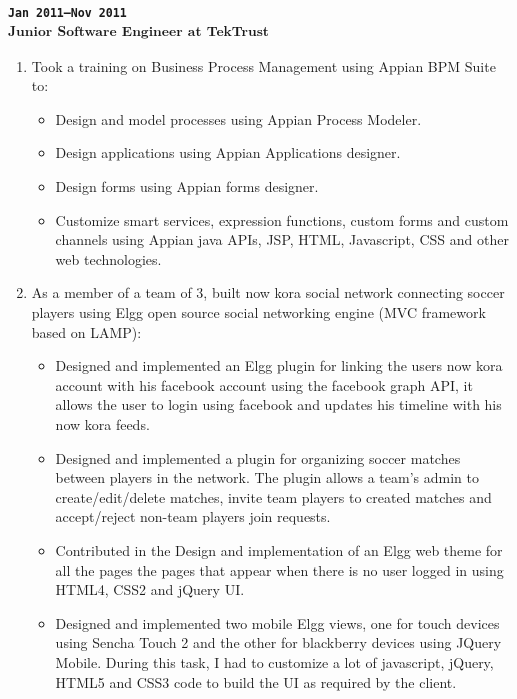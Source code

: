 \subsubsection{\textsubscript{\uppercase{\texttt{Jan 2011--Nov 2011}}\\
Junior Software Engineer at TekTrust}}
\begin {enumerate}
\item Took a training on Business Process Management using Appian BPM Suite to:
\begin {itemize}
\item Design and model processes using Appian Process Modeler.
\item Design applications using Appian Applications designer.
\item Design forms using Appian forms designer.
\item Customize smart services, expression functions, custom forms and custom channels using Appian java APIs,
JSP, HTML, Javascript, CSS and other web technologies.
\end {itemize}
\item As a member of a team of 3, built now kora social network connecting soccer players using Elgg open
source social networking engine (MVC framework based on LAMP):
\begin {itemize}
\item Designed and implemented an Elgg plugin for linking the users now kora account with his facebook account
using the facebook graph API, it allows the user to login using facebook and updates his timeline with his now
kora feeds.
\item Designed and implemented a plugin for organizing soccer matches between players in the network. The plugin
allows a team's admin to create/edit/delete matches, invite team players to created matches and accept/reject
non-team players join requests.
\item Contributed in the Design and implementation of an Elgg web theme for all the pages the pages that appear
when there is no user logged in using HTML4, CSS2 and jQuery UI.
\item Designed and implemented two mobile Elgg views, one for touch devices using Sencha Touch 2 and the other
for blackberry devices using JQuery Mobile. During this task, I had to customize a lot of javascript, jQuery,
HTML5 and CSS3 code to build the UI as required by the client.
\end {itemize}

\end {enumerate}
